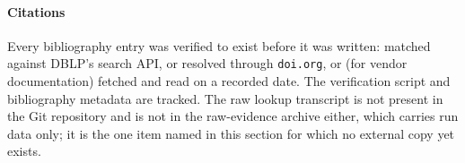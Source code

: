 \paragraph{Citations} Every bibliography entry was verified to exist before it
was written: matched against DBLP's search API, or resolved through
\texttt{doi.org}, or (for vendor documentation) fetched and read on a
recorded date. The verification script and bibliography metadata are tracked.
The raw lookup transcript is not present in the Git repository and is not in
the raw-evidence archive either, which carries run data only; it is the one
item named in this section for which no external copy yet exists.
